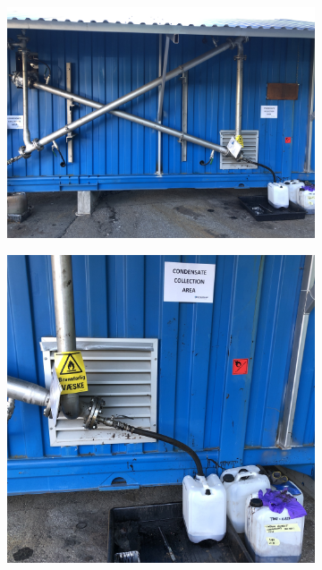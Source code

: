 \begin{figure}
     \centering
     \begin{subfigure}[t]{\linewidth}
         \centering
         \includegraphics[width=0.6\linewidth,scale=0.6]{Bilder/Pyrolysis/Condenser.png}
         \hspace{0.5 cm}
         \caption{}
         \label{fig:condenserfull}
     \end{subfigure}
     \hfill
     \begin{subfigure}[b]{0.3\linewidth}
         \centering
         \includegraphics[width=\linewidth]{Bilder/Pyrolysis/CondensateCollection1.jpg}
         \caption{}
         \label{fig:condensate1}
     \end{subfigure}
     \hfill
     \begin{subfigure}[b]{0.3\linewidth}

\end{subfigure}
\end{figure}
